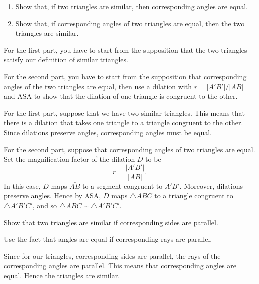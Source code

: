 \documentclass[newpage,hints,handout]{ximera}
\begin{document}
\begin{problem}\hfil
\begin{enumerate}
\item Show that, if two triangles are similar, then corresponding
angles are equal.

\item Show that, if corresponding angles of two triangles are equal, then the two
triangles are similar.
\end{enumerate}

\begin{hint}
For the first part, you have to start from the supposition that the
two triangles satisfy our definition of similar triangles.
\end{hint}
\begin{hint}
For the second part, you have to start from the supposition that
corresponding angles of the two triangles are equal, then use a
dilation with $r=|A'B'|/|AB|$ and ASA to show that the dilation of one
triangle is congruent to the other.
\end{hint}
\begin{freeResponse}
For the first part, suppose that we have two similar triangles. This
means that there is a dilation that takes one triangle to a triangle
congruent to the other. Since dilations preserve angles,
corresponding angles must be equal.

For the second part, suppose that corresponding angles of two
triangles are equal. Set the magnification factor of the dilation $D$
to be
\[
r = \frac{|A'B'|}{|AB|}.
\]
In this case, $D$ maps $\bar{AB}$ to a segment congruent to
$\bar{A'B'}$. Moreover, dilations preserve angles. Hence by ASA, $D$
maps $\triangle ABC$ to a triangle congruent to $\triangle A'B'C'$,
and so $\triangle ABC \sim \triangle A'B'C'$.
\end{freeResponse}
\end{problem}

\begin{problem}
\label{39} Show that two triangles are similar if corresponding
sides are parallel.
\begin{hint}
Use the fact that angles are equal if corresponding rays are parallel.
\end{hint}
\begin{freeResponse}
Since for our triangles, corresponding sides are parallel, the rays of
the corresponding angles are parallel. This means that corresponding
angles are equal. Hence the triangles are similar.
\end{freeResponse}
\end{problem}
\end{document}
